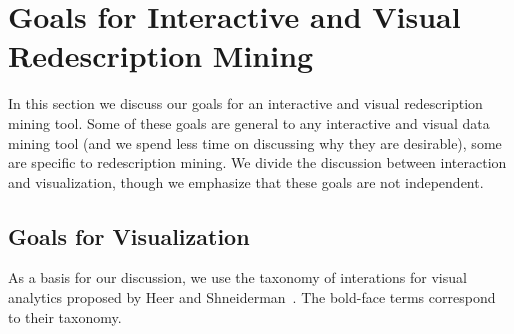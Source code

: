 
\section{Goals for Interactive and Visual Redescription Mining}
\label{sec:goals-inter-visu}

In this section we discuss our goals for an interactive and visual
redescription mining tool. Some of these goals are general to any
interactive and visual data mining tool (and we spend less time on
discussing why they are desirable), some are specific to
redescription mining. We divide the discussion between interaction and
visualization, though we emphasize that these goals are not independent.


\subsection{Goals for Visualization}
\label{sec:goals-visualization}
As a basis for our discussion, we use the taxonomy of interations for
visual analytics proposed by Heer and
Shneiderman~\cite{Heer:2012:IDV:2133806.2133821}. The bold-face terms
correspond to their taxonomy.

